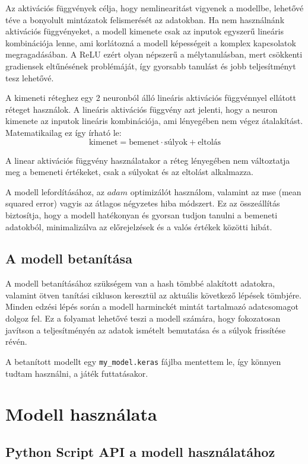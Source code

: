 Az aktivációs függvények célja, hogy nemlinearitást vigyenek a modellbe, lehetővé téve a bonyolult mintázatok felismerését az adatokban. 
Ha nem használnánk aktivációs függvényeket, a modell kimenete csak az inputok egyszerű lineáris kombinációja lenne, ami korlátozná a modell képességeit a komplex kapcsolatok megragadásában.
A ReLU ezért olyan népszerű a mélytanulásban, mert csökkenti gradiensek eltűnésének problémáját, így gyorsabb tanulást és jobb teljesítményt tesz lehetővé.

A kimeneti réteghez egy 2 neuronból álló lineáris aktivációs függvénnyel ellátott réteget használok. A lineáris aktivációs függvény azt jelenti, hogy a neuron kimenete az inputok lineáris kombinációja, ami lényegében nem végez átalakítást. Matematikailag ez így írható le:
\begin{equation}\label{eq:3}
\text{kimenet} = \text{bemenet} \cdot \text{súlyok} + \text{eltolás}
\end{equation}
    

A linear aktivációs függvény használatakor a réteg lényegében nem változtatja meg a bemeneti értékeket, csak a súlyokat és az eltolást alkalmazza.

A modell lefordításához, az $adam$ optimizálót használom, valamint az mse (mean squared error) vagyis az átlagos négyzetes hiba módszert. 
Ez az összeállítás biztosítja, hogy a modell hatékonyan és gyorsan tudjon tanulni a bemeneti adatokból, minimalizálva az előrejelzések és a valós értékek közötti hibát.

\subsection{A modell betanítása}
A modell betanításához szükségem van a hash tömbbé alakított adatokra, valamint ötven tanítási cikluson keresztül az aktuális következő lépések tömbjére. 
Minden edzési lépés során a modell harminckét mintát tartalmazó adatcsomagot dolgoz fel.
Ez a folyamat lehetővé teszi a modell számára, hogy fokozatosan javítson a teljesítményén az adatok ismételt bemutatása és a súlyok frissítése révén. 

A betanított modellt egy \lstinline{my_model.keras} fájlba mentettem le, így könnyen tudtam használni, a játék futtatásakor. 

\section{Modell használata}

\subsection{Python Script API a modell használatához}

